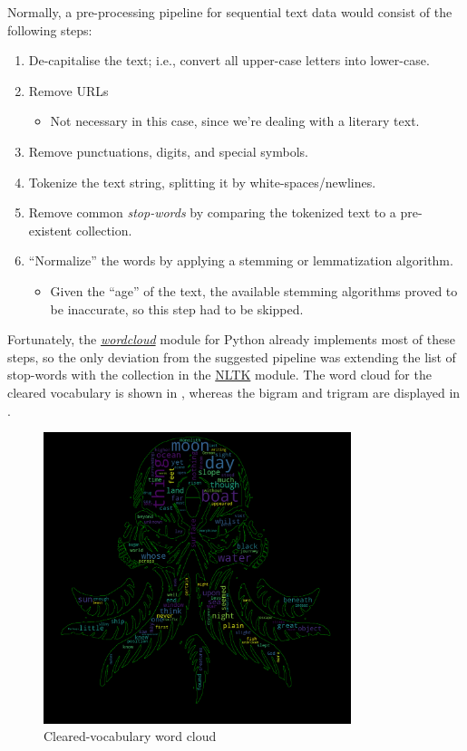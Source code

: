\documentclass{scrartcl}
\begin{document}
  Normally, a pre-processing pipeline for sequential text data would consist of the following steps:

  \begin{enumerate}
    \item De-capitalise the text; i.e., convert all upper-case letters into lower-case.
    \item Remove URLs
    \begin{itemize}
      \item Not necessary in this case, since we're dealing with a literary text.
    \end{itemize}
    \item Remove punctuations, digits, and special symbols.
    \item Tokenize the text string, splitting it by white-spaces/newlines.
    \item Remove common \textit{stop-words} by comparing the tokenized text to a pre-existent collection.
    \item ``Normalize'' the words by applying a stemming or lemmatization algorithm.
    \begin{itemize}
      \item Given the ``age'' of the text, the available stemming algorithms proved to be inaccurate, so this step had to be skipped.
    \end{itemize}
  \end{enumerate}

  Fortunately, the \href{https://amueller.github.io/word_cloud/}{\textit{wordcloud}} module for Python already implements most of these steps, so the only deviation from the suggested pipeline was extending the list of stop-words with the collection in the \href{https://www.nltk.org/}{NLTK} module. The word cloud for the cleared vocabulary is shown in , whereas the bigram and trigram are displayed in .

  \begin{figure}[ht]
    \centering
    \includegraphics[width=0.8\textwidth]{./figures/wordcloud.png}
    \caption{Cleared-vocabulary word cloud}
    \label{fig:wordcloud}
  \end{figure}
\end{document}
